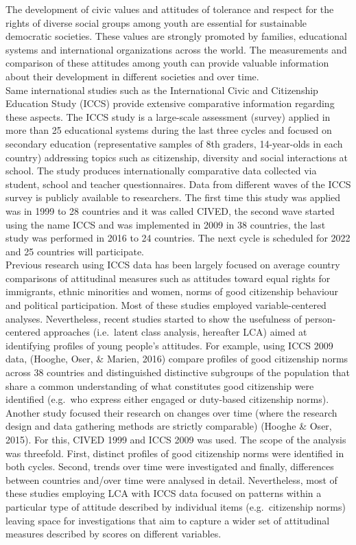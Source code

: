 \documentclass[12pt,twoside]{reedthesis}
\begin{document}
The development of civic values and attitudes of tolerance and respect for the rights of diverse social groups among youth are essential for sustainable democratic societies. These values are strongly promoted by families, educational systems and international organizations across the world. The measurements and comparison of these attitudes among youth can provide valuable information about their development in different societies and over time.\\
\newline  
Same international studies such as the International Civic and Citizenship Education Study (ICCS) provide extensive comparative information regarding these aspects. The ICCS study is a large-scale assessment (survey) applied in more than 25 educational systems during the last three cycles and focused on secondary education (representative samples of 8th graders, 14-year-olds in each country) addressing topics such as citizenship, diversity and social interactions at school. The study produces internationally comparative data collected via student, school and teacher questionnaires. Data from different waves of the ICCS survey is publicly available to researchers. The first time this study was applied was in 1999 to 28 countries and it was called CIVED, the second wave started using the name ICCS and was implemented in 2009 in 38 countries, the last study was performed in 2016 to 24 countries. The next cycle is scheduled for 2022 and 25 countries will participate.\\
\newline 
Previous research using ICCS data has been largely focused on average country comparisons of attitudinal measures such as attitudes toward equal rights for immigrants, ethnic minorities and women, norms of good citizenship behaviour and political participation. Most of these studies employed variable-centered analyses. Nevertheless, recent studies started to show the usefulness of person-centered approaches (i.e.~latent class analysis, hereafter LCA) aimed at identifying profiles of young people's attitudes. For example, using ICCS 2009 data, (Hooghe, Oser, \& Marien, 2016) compare profiles of good citizenship norms across 38 countries and distinguished distinctive subgroups of the population that share a common understanding of what constitutes good citizenship were identified (e.g.~who express either engaged or duty-based citizenship norms).\\
\newline 
Another study focused their research on changes over time (where the research design and data gathering methods are strictly comparable) (Hooghe \& Oser, 2015). For this, CIVED 1999 and ICCS 2009 was used. The scope of the analysis was threefold. First, distinct profiles of good citizenship norms were identified in both cycles. Second, trends over time were investigated and finally, differences between countries and/over time were analysed in detail. Nevertheless, most of these studies employing LCA with ICCS data focused on patterns within a particular type of attitude described by individual items (e.g.~citizenship norms) leaving space for investigations that aim to capture a wider set of attitudinal measures described by scores on different variables.\\
\end{document}

